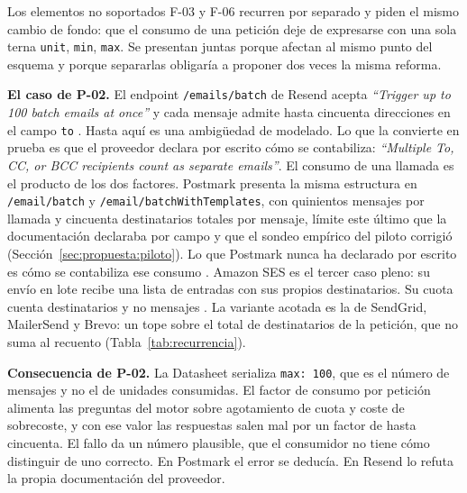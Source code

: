 Los elementos no soportados F-03 y F-06 recurren por separado y piden el mismo cambio de fondo:
que el consumo de una petición deje de expresarse con una sola terna
\texttt{unit}, \texttt{min}, \texttt{max}. Se presentan juntas porque afectan al
mismo punto del esquema y porque separarlas obligaría a proponer dos veces la
misma reforma.

\textbf{El caso de P-02.} El endpoint \texttt{/emails/batch} de Resend acepta
\textit{``Trigger up to 100 batch emails at once''} y cada mensaje admite hasta
cincuenta direcciones en el campo \texttt{to} \citep{resenddocs}. Hasta aquí es
una ambigüedad de modelado. Lo que la convierte en prueba es que el proveedor
declara por escrito cómo se contabiliza: \textit{``Multiple To, CC, or BCC
recipients count as separate emails''}. El consumo de una llamada es el producto
de los dos factores. Postmark presenta la misma estructura en
\texttt{/email/batch} y \texttt{/email/batchWithTemplates}, con quinientos
mensajes por llamada y cincuenta destinatarios totales por mensaje, límite este
último que la documentación declaraba por campo y que el sondeo empírico del
piloto corrigió (Sección~\ref{sec:propuesta:piloto}). Lo que Postmark nunca ha
declarado por escrito es cómo se contabiliza ese consumo \citep{postmarkapi}.
Amazon SES es el tercer caso pleno: su envío en lote recibe una lista de entradas con sus propios destinatarios.
Su cuota cuenta destinatarios y no mensajes \citep{sesdocs}.
La variante acotada es la de SendGrid, MailerSend y Brevo: un tope sobre el total de destinatarios de la petición, que no suma al recuento (Tabla~\ref{tab:recurrencia}).

\textbf{Consecuencia de P-02.} La Datasheet serializa \texttt{max: 100}, que es el
número de mensajes y no el de unidades consumidas. El factor de consumo por
petición alimenta las preguntas del motor sobre agotamiento de cuota y coste de
sobrecoste, y con ese valor las respuestas salen mal por un factor de hasta
cincuenta.
El fallo da un número plausible, que el consumidor no tiene cómo distinguir de uno correcto.
En Postmark el error se deducía. En Resend lo
refuta la propia documentación del proveedor.

